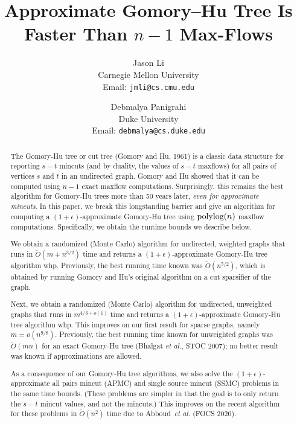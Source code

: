 \documentclass[11pt]{article}
\newcommand{\e}{\epsilon}
\newcommand{\1}{\mathbbm 1}
\newcommand{\polylog}{\textup{polylog}}
\newcommand{\tO}{\tilde{O}}
\newcommand{\ssc}{{\sc SSMC}\xspace}
\newcommand{\apc}{{\sc APMC}\xspace}
\renewcommand{\em}{\it}
\begin{document}
\title{Approximate Gomory--Hu Tree Is Faster Than $n-1$ Max-Flows}
\author{
{Jason Li\\Carnegie Mellon University\\Email: {\tt jmli@cs.cmu.edu}} 
\and 
{Debmalya Panigrahi\\Duke University\\Email: {\tt debmalya@cs.duke.edu}}
}
\date{}
\maketitle

\begin{abstract}
    The Gomory-Hu tree or cut tree (Gomory and Hu, 1961) is a classic data structure for reporting $s-t$ mincuts (and by duality, the values of $s-t$ maxflows) for all pairs of vertices $s$ and $t$ in an undirected graph. Gomory and Hu showed that it can be computed using $n-1$ exact maxflow computations. Surprisingly, this remains the best algorithm for Gomory-Hu trees more than 50 years later, {\em even for approximate mincuts}. In this paper, we break this longstanding barrier and give an algorithm for computing a $(1+\e)$-approximate Gomory-Hu tree using $\polylog(n)$ maxflow computations. Specifically, we obtain the runtime bounds we describe below.
    
    We obtain a randomized (Monte Carlo) algorithm for undirected, weighted graphs that runs in $\tO(m + n^{3/2})$ time and returns a $(1+\e)$-approximate Gomory-Hu tree algorithm whp. Previously, the best running time known was $\tO(n^{5/2})$, which is obtained by running Gomory and Hu's original algorithm on a cut sparsifier of the graph.
    
    Next, we obtain a randomized (Monte Carlo) algorithm for undirected, unweighted graphs that runs in $m^{4/3+o(1)}$ time and returns a $(1+\e)$-approximate Gomory-Hu tree algorithm whp. This improves on our first result for sparse graphs, namely $m = o(n^{9/8})$. Previously, the best running time known for unweighted graphs was $\tO(mn)$ for an exact Gomory-Hu tree (Bhalgat {\em et al.}, STOC 2007); no better result was known if approximations are allowed.
    
    As a consequence of our Gomory-Hu tree algorithms, we also solve the $(1+\e)$-approximate all pairs mincut (\apc) and single source mincut (\ssc) problems in the same time bounds. (These problems are simpler in that the goal is to only return the $s-t$ mincut values, and not the mincuts.) This improves on the recent algorithm for these problems in $\tO(n^2)$ time due to Abboud~{\em et al.} (FOCS 2020).
\end{abstract}
\end{document}

